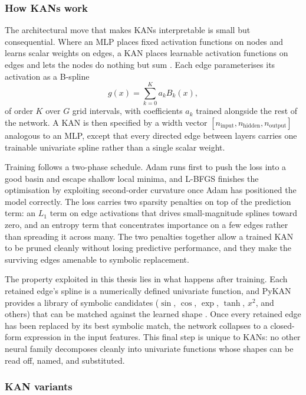 \documentclass[12pt,a4paper,oneside]{article}
\begin{document}
\subsubsection{How KANs work}\label{subsubsec:kan_arch}

The architectural move that makes KANs interpretable is small but consequential. Where an MLP places fixed activation functions on nodes and learns scalar weights on edges, a KAN places learnable activation functions on edges and lets the nodes do nothing but sum \citep{liu_kan_2024}. Each edge parameterises its activation as a B-spline
\begin{equation}
g(x) = \sum_{k=0}^{K} a_k B_k(x),
\label{eq:kan_edge}
\end{equation}
of order $K$ over $G$ grid intervals, with coefficients $a_k$ trained alongside the rest of the network. A KAN is then specified by a width vector $[n_{\text{input}}, n_{\text{hidden}}, n_{\text{output}}]$ analogous to an MLP, except that every directed edge between layers carries one trainable univariate spline rather than a single scalar weight.

Training follows a two-phase schedule. Adam runs first to push the loss into a good basin and escape shallow local minima, and L-BFGS finishes the optimisation by exploiting second-order curvature once Adam has positioned the model correctly. The loss carries two sparsity penalties on top of the prediction term: an $L_1$ term on edge activations that drives small-magnitude splines toward zero, and an entropy term that concentrates importance on a few edges rather than spreading it across many. The two penalties together allow a trained KAN to be pruned cleanly without losing predictive performance, and they make the surviving edges amenable to symbolic replacement.

The property exploited in this thesis lies in what happens after training. Each retained edge's spline is a numerically defined univariate function, and PyKAN provides a library of symbolic candidates ($\sin$, $\cos$, $\exp$, $\tanh$, $x^2$, and others) that can be matched against the learned shape \citep{liu_kan_2024}. Once every retained edge has been replaced by its best symbolic match, the network collapses to a closed-form expression in the input features. This final step is unique to KANs: no other neural family decomposes cleanly into univariate functions whose shapes can be read off, named, and substituted.


\subsubsection{KAN variants}\label{subsubsec:kan_variants}
\end{document}
